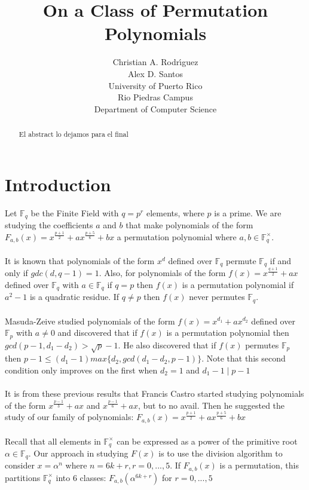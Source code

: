 \documentclass[12pt]{article}
\title{On a Class of Permutation Polynomials}
\author{Christian A. Rodr\'{\i}guez \\ Alex D. Santos \\ University of Puerto Rico \\ Rio Piedras Campus \\ Department of Computer Science}
\date{}
\begin{document}
\maketitle

\begin{abstract}

El abstract lo dejamos para el final

\end{abstract}

\section{Introduction}\label{intro}

Let $\mathbb{F}_{q}$ be the Finite Field with $q=p^{r}$ elements, where $p$ is a prime. We are studying the coefficients $a$ and $b$ that make polynomials of the form $F_{a,b}(x)=x^{\frac{p+1}{2}} + ax^{\frac{p+5}{6}} + bx$ a permutation polynomial where $a,b \in \mathbb{F}_{q}^{\times}$. \\
\\
It is known that polynomials of the form $x^{d}$ defined over $\mathbb{F}_{q}$ permute $\mathbb{F}_{q}$ if and only if $gdc(d,q-1)=1$. Also, for polynomials of the form $f(x)=x^{\frac{q+1}{2}}+ax$ defined over $\mathbb{F}_{q}$ with $a \in \mathbb{F}_{q}$ if $q=p$ then $f(x)$ is a permutation polynomial if $a^{2}-1$ is a quadratic residue. If $q\neq p$ then $f(x)$ never permutes $\mathbb{F}_{q}$.\\
\\
Masuda-Zeive studied polynomials of the form $f(x)=x^{d_{1}}+ax^{d_{2}}$ defined over $\mathbb{F}_{p}$ with $a\neq 0$ and discovered that if $f(x)$ is a permutation polynomial then $gcd(p-1,d_{1}-d_{2})>\sqrt{p}-1$. He also discovered that if $f(x)$ permutes $\mathbb{F}_{p}$ then $p-1\leq (d_{1}-1)max\lbrace d_{2},gcd(d_{1}-d_{2},p-1) \rbrace$. Note that this second condition only improves on the first when $d_{2}=1$ and $d_{1}-1 \mid p-1$ \\
\\
It is from these previous results that Francis Castro started studying polynomials of the form $x^{\frac{p-1}{3}}+ax$ and $x^{\frac{p-1}{6}}+ax$, but to no avail. Then he suggested the study of our family of polynomials: $F_{a,b}(x)=x^{\frac{p+1}{2}} + ax^{\frac{p+5}{6}} + bx$ \\
\\
Recall that all elements in $\mathbb{F}_{q}^{\times}$ can be expressed as a power of the primitive root $\alpha \in \mathbb{F}_{q}$. Our approach in studying $F(x)$ is to use the division algorithm to consider $x=\alpha^{n}$ where $n=6k+r, r=0,...,5$. If $F_{a,b}(x)$ is a permutation, this partitions $\mathbb{F}_{q}^{\times}$ into 6 classes: $F_{a,b}(\alpha^{6k+r})$ for $r=0,...,5$
\end{document}
